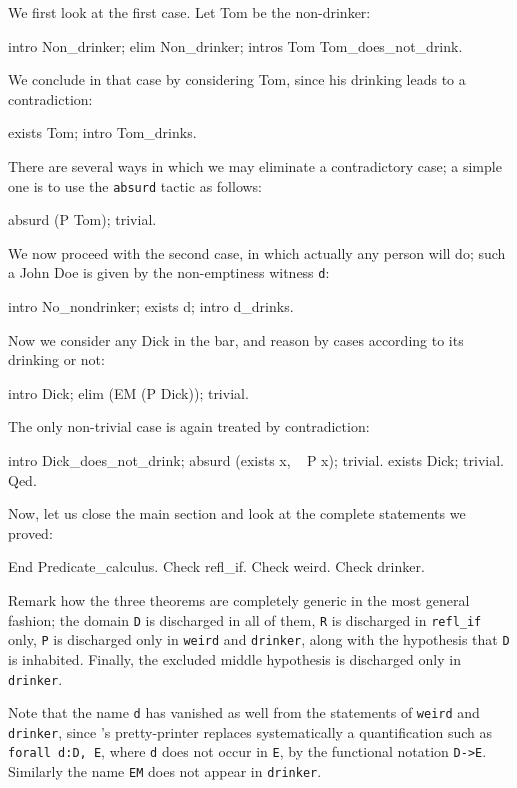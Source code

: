 \documentclass[11pt,a4paper]{book}
\begin{document}
We first look at the first case. Let Tom be the non-drinker:
\begin{coq_example}
intro Non_drinker; elim Non_drinker;
  intros Tom Tom_does_not_drink.
\end{coq_example}

We conclude in that case by considering Tom, since his drinking leads to
a contradiction:
\begin{coq_example}
exists Tom; intro Tom_drinks.
\end{coq_example}

There are several ways in which we may eliminate a contradictory case;
a simple one is to use the \verb:absurd: tactic as follows:
\begin{coq_example}
absurd (P Tom); trivial.
\end{coq_example}

We now proceed with the second case, in which actually any person will do;
such a John Doe is given by the non-emptiness witness \verb:d::
\begin{coq_example}
intro No_nondrinker; exists d; intro d_drinks.
\end{coq_example}

Now we consider any Dick in the bar, and reason by cases according to its
drinking or not:
\begin{coq_example}
intro Dick; elim (EM (P Dick)); trivial.
\end{coq_example}

The only non-trivial case is again treated by contradiction:
\begin{coq_example}
intro Dick_does_not_drink; absurd (exists x, ~ P x); trivial.
exists Dick; trivial.
Qed.
\end{coq_example}

Now, let us close the main section and look at the complete statements
we proved:
\begin{coq_example}
End Predicate_calculus.
Check refl_if.
Check weird.
Check drinker.
\end{coq_example}

Remark how the three theorems are completely generic in the most general 
fashion;
the domain \verb:D: is discharged in all of them, \verb:R: is discharged in
\verb:refl_if: only, \verb:P: is discharged only in \verb:weird: and
\verb:drinker:, along with the hypothesis that \verb:D: is inhabited. 
Finally, the excluded middle hypothesis is discharged only in 
\verb:drinker:.

Note that the name \verb:d: has vanished as well from
the statements of \verb:weird: and \verb:drinker:, 
since \Coq's pretty-printer replaces
systematically a quantification such as \verb+forall d:D, E+, where \verb:d:
does not occur in \verb:E:, by the functional notation \verb:D->E:. 
Similarly the name \verb:EM: does not appear in \verb:drinker:. 
\end{document}

